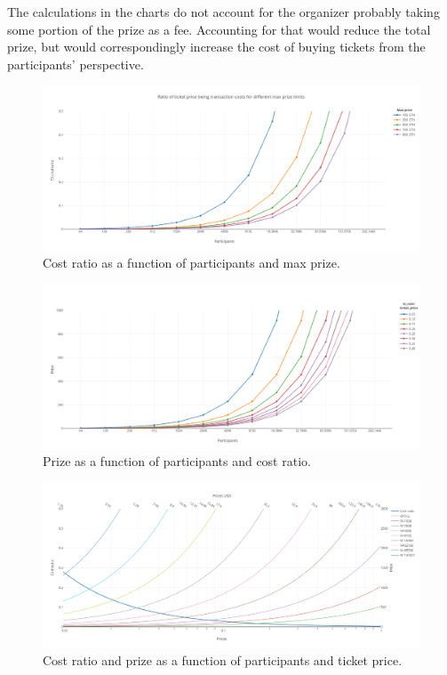 The calculations in the charts do not account for the organizer probably taking some portion of the prize as a fee. Accounting for that would reduce the total prize, but would correspondingly increase the cost of buying tickets from the participants' perspective.


\begin{figure}[htbp]
  \centering
  \includegraphics[width=\columnwidth]{figures/max_participants_cost_ratio.png}
  \caption{Cost ratio as a function of participants and max prize.}
  \label{fig:cost-ratio-chart}
\end{figure}

\begin{figure}[htbp]
  \centering
  \includegraphics[width=\columnwidth]{figures/max_participants_prize.png}
  \caption{Prize as a function of participants and cost ratio.}
  \label{fig:prize-chart}
\end{figure}

\begin{figure}[htbp]
  \centering
  \includegraphics[width=\columnwidth]{figures/ticket_prices.png}
  \caption{Cost ratio and prize as a function of participants and ticket price.}
  \label{fig:price-chart}
\end{figure}
